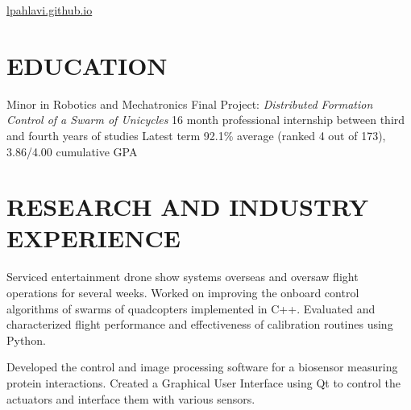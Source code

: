 \documentclass{ResumeTemplate}
\begin{document}
	
	
	{\href{https://lpahlavi.github.io}{lpahlavi.github.io}}
	
	\section{EDUCATION}
	
	\workitemsfour
	{Minor in Robotics and Mechatronics}
	{Final Project: \textit{Distributed Formation Control of a Swarm of Unicycles}}
	{16 month professional internship between third and fourth years of studies}
	{Latest term 92.1\% average (ranked 4 out of 173), 3.86/4.00 cumulative GPA}
	
	\section{RESEARCH AND INDUSTRY EXPERIENCE}
	

	\workitemsthree
	{Serviced entertainment drone show systems overseas and oversaw flight operations for several weeks.}
	{Worked on improving the onboard control algorithms of swarms of quadcopters implemented in C++.}
	{Evaluated and characterized flight performance and effectiveness of calibration routines using Python.}
	
	
	\workitemstwo
	{Developed the control and image processing software for a biosensor measuring protein interactions.}
	{Created a Graphical User Interface using Qt to control the actuators and interface them with various sensors.}
	
\end{document}

